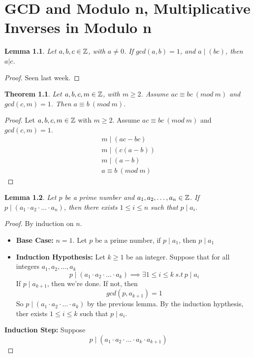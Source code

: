 \documentclass[openany]{report}
\newtheorem{theorem}{Theorem}[section]
\newtheorem{lemma}{Lemma}[section]
\begin{document}
\chapter{GCD and Modulo n, Multiplicative Inverses in Modulo n}
\begin{lemma}\label{lemma8.0.1}
Let $a,b,c \in \mathbb{Z}$, with $a \neq 0$. If $gcd(a,b) = 1$, and $a \mid (bc)$, then $a|c$.
\end{lemma}
\begin{proof}
    Seen last week.
\end{proof}
\begin{theorem}\label{theorem8.0.1}
    Let $a,b,c,m \in \mathbb{Z}$, with $m \geq 2$. Assume $ac \equiv bc \ (mod \ m)$ and $gcd(c,m) = 1$. Then $a \equiv b \ (mod \ m)$.
\end{theorem}
\begin{proof}
    Let $a,b,c,m \in \mathbb{Z}$ with $m \geq 2$. Assume $ac \equiv bc \ (mod \ m)$ and $gcd(c,m) = 1$.
    \begin{align*}
        m \mid (ac-bc)\tag{def of mod}\\
        m \mid (c(a-b))\\
        m \mid (a-b)\tag{by previous lemma}\\
        a \equiv b \ (mod \ m)\tag{def of mod}
    \end{align*}
\end{proof}
\begin{lemma}\label{lemma8.0.2}
    Let $p$ be a prime number and $a_1, a_2,\dots,a_n \in \mathbb{Z}$.
    If $p \mid (a_1 \cdot a_2 \cdot \dots \cdot a_n)$, then there exists $1 \leq i \leq n$ such that $p \mid a_i$.
\end{lemma}
\begin{proof}
    By induction on $n$.
    \begin{itemize}
        \item \textbf{Base Case:} $n = 1$. Let $p$ be a prime number, if $p \mid a_1$, then $p\mid a_1$
        \item \textbf{Induction Hypothesis:} Let $k \geq 1$ be an integer. Suppose that for all integers $a_1, a_2, \dots, a_k$
        $$p\mid(a_1 \cdot a_2 \cdot \ldots \cdot a_k) \implies \exists 1 \leq i \leq k \ s.t \ p\mid a_i$$
        If $p \mid a_{k+1}$, then we're done. If not, then 
        $$gcd(p,a_{k+1}) = 1$$
        So $p\mid(a_1 \cdot a_2 \cdot \ldots \cdot a_k)$ by the previous lemma. By the induction hypthesis, ther exists $1 \leq i \leq k$ such that $p \mid a_i$.
    \end{itemize}
    \item \textbf{Induction Step:} Suppose
    $$p \mid (a_1 \cdot a_2 \cdot \ldots \cdot a_k \cdot a_{k+1})$$
\end{proof}
\end{document}
